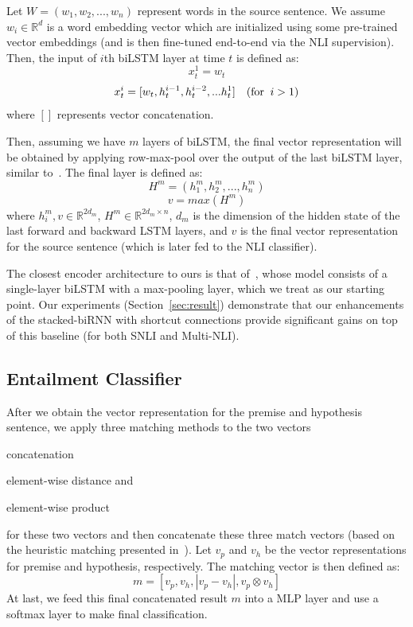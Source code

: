 \documentclass[11pt,letterpaper]{article}
\begin{document}
Let $W=(w_1, w_2, ..., w_n)$ represent words in the source sentence. We assume $w_i \in \mathbb{R}^d$ is a word embedding vector which are initialized using some pre-trained vector embeddings (and is then fine-tuned end-to-end via the NLI supervision). Then, the input of $i$th biLSTM layer at time $t$ is defined as:
\begin{equation}
x_t^1 = w_t
\end{equation}
\begin{equation}
x_t^i = [w_t, h_t^{i-1}, h_t^{i-2}, ... h_t^{1}] \quad (\textrm{for} \;\; i>1)\\
\end{equation}
where $[]$ represents vector concatenation.

Then, assuming we have $m$ layers of biLSTM, the final vector representation will be obtained by applying row-max-pool over the output of the last biLSTM layer, similar to~. The final layer is defined as:
%
\begin{equation}
H^m=(h_1^m, h_2^m, ..., h_n^m)
\end{equation}
\begin{equation}
v=max(H^m)
\end{equation}
%
where $h_i^m,v \in \mathbb{R}^{2d_m}$, $H^m \in \mathbb{R}^{2d_m \times n}$, $d_m$ is the dimension of the hidden state of the last forward and backward LSTM layers, and $v$ is the final vector representation for the source sentence (which is later fed to the NLI classifier).


The closest encoder architecture to ours is that of~, whose model consists of a single-layer biLSTM with a max-pooling layer, which we treat as our starting point. Our experiments (Section~\ref{sec:result}) demonstrate that  our enhancements of the stacked-biRNN with shortcut connections provide significant gains on top of this baseline (for both SNLI and Multi-NLI).


\subsection{Entailment Classifier}
After we obtain the vector representation for the premise and hypothesis sentence, we apply three matching methods to the two vectors \begin{inparaenum}[(i)]
\item{concatenation}
\item{element-wise distance} and
\item{element-wise product}
\end{inparaenum} for these two vectors and then concatenate these three match vectors (based on the heuristic matching presented in~). Let $v_p$ and $v_h$ be the vector representations for premise and hypothesis, respectively. The matching vector is then defined as:
\begin{equation}
m=[v_p, v_h, \left|v_p - v_h\right|, v_p \otimes v_h]
\end{equation}
At last, we feed this final concatenated result $m$ into a MLP layer and use a softmax layer to make final classification.
\end{document}
